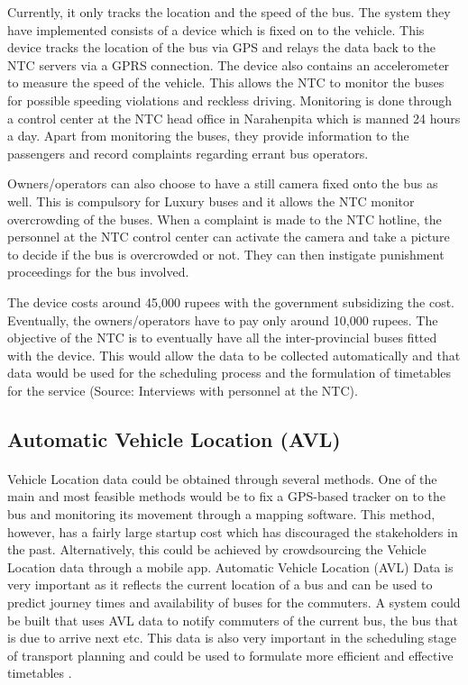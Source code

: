 Currently, it only tracks the location and the speed of the bus. The system they have implemented consists of a device which is fixed on to the vehicle. This device tracks the location of the bus via GPS and relays the data back to the NTC servers via a GPRS connection. The device also contains an accelerometer to measure the speed of the vehicle. This allows the NTC to monitor the buses for possible speeding violations and reckless driving. Monitoring is done through a control center at the NTC head office in Narahenpita which is manned 24 hours a day. Apart from monitoring the buses, they provide information to the passengers and record complaints regarding errant bus operators.

Owners/operators can also choose to have a still camera fixed onto the bus as well. This is compulsory for Luxury buses and it allows the NTC monitor overcrowding of the buses. When a complaint is made to the NTC hotline, the personnel at the NTC control center can activate the camera and take a picture to decide if the bus is overcrowded or not. They can then instigate punishment proceedings for the bus involved.

The device costs around 45,000 rupees with the government subsidizing the cost. Eventually, the owners/operators have to pay only around 10,000 rupees. The objective of the NTC is to eventually have all the inter-provincial buses fitted with the device. This would allow the data to be collected automatically and that data would be used for the scheduling process and the formulation of timetables for the service (Source: Interviews with personnel at the NTC).

\subsection{Automatic Vehicle Location (AVL)}

\paragraph{ } Vehicle Location data could be obtained through several methods. One of the main and most feasible methods would be to fix a GPS-based tracker on to the bus and monitoring its movement through a mapping software. This method, however, has a fairly large startup cost which has discouraged the stakeholders in the past. Alternatively, this could be achieved by crowdsourcing the Vehicle Location data through a mobile app. Automatic Vehicle Location (AVL) Data is very important as it reflects the current location of a bus and can be used to predict journey times and availability of buses for the commuters. A system could be built that uses AVL data to notify commuters of the current bus, the bus that is due to arrive next etc. This data is also very important in the scheduling stage of transport planning and could be used to formulate more efficient and effective timetables \cite{Wilson2009}.

